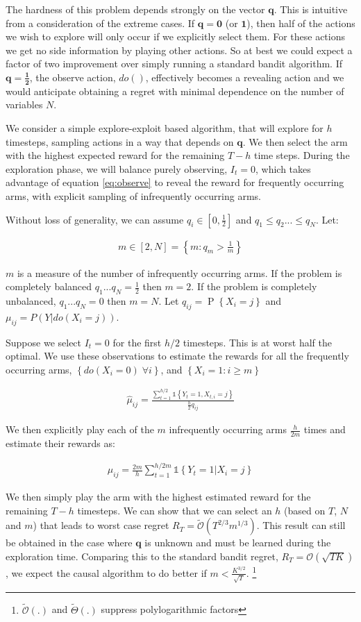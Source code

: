 \documentclass[11pt,a4paper]{article}
\newcommand{\set}[1]{\left\{#1\right\}}
\newcommand{\ind}[1]{\mathds{1}\!\!\set{#1}}
\newcommand{\eqn}[1]{\begin{align}#1\end{align}}
\newcommand{\bigo}[1]{\mathcal{O}\left( #1 \right)}
\newcommand{\bigotilde}[1]{\tilde{\mathcal{O}}\left( #1 \right)}
\newcommand{\bigthetatilde}[1]{\tilde{\Theta}\left( #1 \right)}
\renewcommand{\P}[1]{\operatorname{P}\left\{#1\right\}}
\begin{document}
The hardness of this problem depends strongly on the vector $\boldsymbol{q}$. This is intuitive from a consideration of the extreme cases. If $\boldsymbol{q} = \boldsymbol{0}$ (or $\boldsymbol{1}$), then half of the actions we wish to explore will only occur if we explicitly select them. For these actions we get no side information by playing other actions. So at best we could expect a factor of two improvement over simply running a standard bandit algorithm. If $\boldsymbol{q} = \boldsymbol{\frac{1}{2}}$, the observe action, $do()$, effectively becomes a revealing action and we would anticipate obtaining a regret with minimal dependence on the number of variables $N$. 

We consider a simple explore-exploit based algorithm, that will explore for $h$ timesteps, sampling actions in a way that depends on $\boldsymbol{q}$. We then select the arm with the highest expected reward for the remaining $T-h$ time steps. During the exploration phase, we will balance purely observing, $I_t = 0$, which takes advantage of equation \ref{eq:observe} to reveal the reward for frequently occurring arms, with explicit sampling of infrequently occurring arms. 

Without loss of generality, we can assume $q_i \in [0,\frac{1}{2}]$ and $q_1 \leq q_2 ... \leq q_N$. Let:

\eqn {
m \in [2,N] = \set{m:q_m > \frac{1}{m}}
}

$m$ is a measure of the number of infrequently occurring arms. If the problem is completely balanced $q_1...q_N = \frac{1}{2}$ then $m = 2$. If the problem is completely unbalanced, $q_1...q_N = 0$ then $m=N$.  Let $q_{ij} = \P{X_i = j}$ and $\mu_{ij} = P(Y|do(X_i = j))$.


Suppose we select $I_t = 0$ for the first $h/2$ timesteps. This is at worst half the optimal. We use these observations to estimate the rewards for all the frequently occurring arms, $\set{do(X_i = 0) \; \forall i}$, and $\set{X_i = 1:i \geq m}$ 

\eqn {
\hat{\mu}_{ij} = \frac{\sum_{t=1}^{h/2}\ind{Y_t=1,X_{t,i}=j}}{\frac{h}{2}q_{ij}}
}

We then explicitly play each of the $m$ infrequently occurring arms $\frac{h}{2m}$ times and estimate their rewards as:

\eqn {
\hat{\mu}_{ij} = \frac{2m}{h}\sum_{t = 1}^{h/2m}\ind{Y_t = 1|X_i=j}
}

We then simply play the arm with the highest estimated reward for the remaining $T-h$ timesteps. We can show that we can select an $h$ (based on $T$, $N$ and $m$) that leads to worst case regret $R_T = \bigotilde{T^{2/3}m^{1/3}}$. This result can still be obtained in the case where $\boldsymbol{q}$ is unknown and must be learned during the exploration time. Comparing this to the standard bandit regret, $R_T = \bigo{\sqrt{TK}}$, we expect the causal algorithm to do better if $m < \frac{K^{3/2}}{\sqrt{T}}$. \footnote{ $\bigotilde{.}$ and $\bigthetatilde{.}$ suppress polylogarithmic factors}
\end{document}
